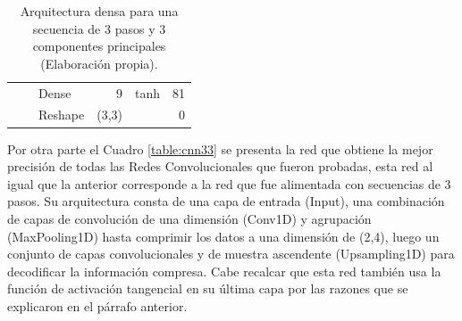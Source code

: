\begin{table}[H]
\begin{center}
\begin{tabular}{ll|l|r|l|r|}
\multicolumn{1}{|l|}{}                              &                             & Dense                              & 9                                    & tanh                                     & 81                                          \\ \cline{3-6} 
\multicolumn{1}{|l|}{}                              &                             & Reshape                            & (3,3)                                &                                          & 0                                           \\ \hline
\end{tabular}
\end{center}
\caption{Arquitectura densa para una secuencia de 3 pasos y 3 componentes principales (Elaboraci\'{o}n propia).}
\label{table:dense33}
\end{table}




Por otra parte el Cuadro \ref{table:cnn33} se presenta la red que obtiene la mejor precisi\'{o}n de todas las Redes Convolucionales que fueron probadas, esta red al igual que la anterior corresponde a la red que fue alimentada con secuencias de 3 pasos. Su arquitectura consta de una capa de entrada (Input), una combinaci\'{o}n de capas de convoluci\'{o}n de una dimensi\'{o}n (Conv1D) y agrupaci\'{o}n (MaxPooling1D) hasta comprimir los datos a una dimensi\'{o}n de (2,4), luego un conjunto de capas convolucionales y de muestra ascendente (Upsampling1D) para decodificar la informaci\'{o}n compresa. Cabe recalcar que esta red tambi\'{e}n usa la funci\'{o}n de activaci\'{o}n tangencial en su \'{u}ltima capa por las razones que se explicaron en el p\'{a}rrafo anterior.

